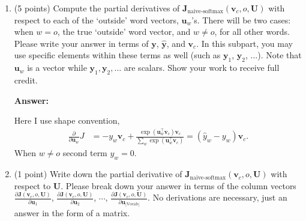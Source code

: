 \documentclass{article}
\newenvironment{answer}{
    {\bf Answer:} \sf \begingroup\color{red}
}{\endgroup}%
\begin{document}
\begin{enumerate}[label=(\alph*)]
\begin{shaded}
\begin{answer}
Whether normalization takes away information or not depends on word embedding procedure. Let's assume that positive words (e.g. 'happy', 'good', 'excellent') have much higher norm then negative words (e.g. 'sad', 'bad', 'awful'). If we were to simply add embeddings of all the words ina sentence and deduce 'sign' of the sentence based on this sum, our result would always be skewed towards positive side, even when we have more negative words than positive words.

On the other hand, it may be useful to encode 'strength' of how positive/negative word is through its embedding vector magnitude, so that say 'excellent' has larger magnitude than 'good' and hence contributes more 'positive' weight.
\end{answer}
\end{shaded}

\item (5 points) Compute the partial derivatives of $\bm J_{\text{naive-softmax}}(\bm v_c, o, \bm U)$ with respect to each of the `outside' word vectors, $\bm u_w$'s. There will be two cases: when $w=o$, the true `outside' word vector, and $w \neq o$, for all other words. Please write your answer in terms of $\bm y$, $\hat{\bm y}$, and $\bm v_c$. In this subpart, you may use specific elements within these terms as well (such as $\bm y_1$, $\bm y_2$, $\dots$). Note that $\bm u_w$ is a vector while $\bm y_1, \bm y_2, \dots$ are scalars. Show your work to receive full credit.

\begin{shaded}
\begin{answer}
Here I use shape convention,
\begin{align}
    \frac{\partial }{\partial \bm u_w} J 
    &= - y_w\bm v_c + \frac{\exp(\bm u_{w}^\top \bm v_c) \bm v_{c}}{\sum_{w} \exp(\bm u_{w}^\top \bm v_c)}
    = (\hat{y}_w - y_w)\bm v_c.
\end{align}
When $w\neq o$ second term $y_w = 0$.
\end{answer}
\end{shaded}

\item (1 point) Write down the partial derivative of $\bm J_{\text{naive-softmax}}(\bm v_c, o, \bm U)$ with respect to $\bm U$. Please break down your answer in terms of the column vectors $\frac{\partial \bm J(\bm v_c, o, \bm U)}{\partial \bm u_1}$, $\frac{\partial \bm J(\bm v_c, o, \bm U)}{\partial \bm u_2}$, $\cdots$, $\frac{\partial \bm J(\bm v_c, o, \bm U)}{\partial \bm u_{|\text{Vocab}|}}$. No derivations are necessary, just an answer in the form of a matrix.


\end{enumerate}
\end{document}
